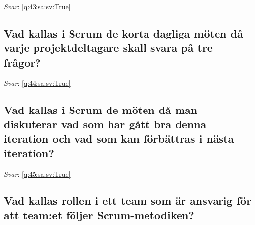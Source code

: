 \documentclass[a4paper,11pt,oneside]{article}
\begin{document}
\begin{sloppypar}
\label{q:43:sa:sv:False}

\vspace{2cm}

\noindent\makebox[\textwidth]{\hrulefill}

\vspace{1cm}

\textit{Svar}: \autoref{q:43:sa:sv:True}



\subsection{Vad kallas i Scrum de korta dagliga m\"oten d\r{a} varje projektdeltagare skall svara p\r{a} tre fr\r{a}gor?}

\label{q:44:sa:sv:False}

\vspace{2cm}

\noindent\makebox[\textwidth]{\hrulefill}

\vspace{1cm}

\textit{Svar}: \autoref{q:44:sa:sv:True}



\subsection{Vad kallas i Scrum de m\"oten d\r{a} man diskuterar vad som har g\r{a}tt bra denna iteration och vad som kan f\"orb\"attras i n\"asta iteration?}

\label{q:45:sa:sv:False}

\vspace{2cm}

\noindent\makebox[\textwidth]{\hrulefill}

\vspace{1cm}

\textit{Svar}: \autoref{q:45:sa:sv:True}



\subsection{Vad kallas rollen i ett team som \"ar ansvarig f\"or att team:et f\"oljer Scrum-metodiken?}

\label{q:46:sa:sv:False}

\vspace{2cm}

\noindent\makebox[\textwidth]{\hrulefill}


\end{sloppypar}
\end{document}
